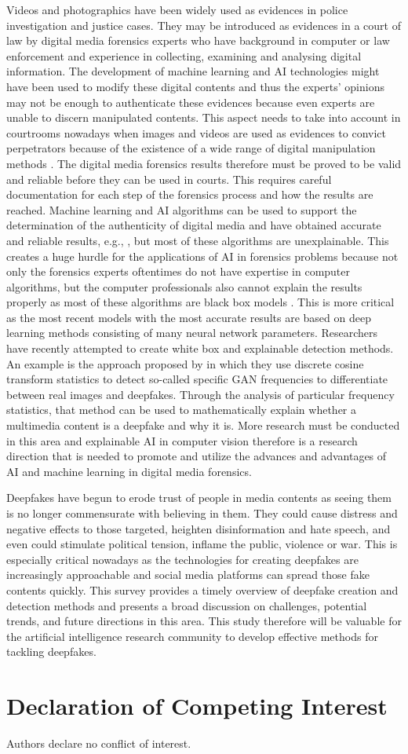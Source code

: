 Videos and photographics have been widely used as evidences in police investigation and justice cases. They may be introduced as evidences in a court of law by digital media forensics experts who have background in computer or law enforcement and experience in collecting, examining and analysing digital information. The development of machine learning and AI technologies might have been used to modify these digital contents and thus the experts' opinions may not be enough to authenticate these evidences because even experts are unable to discern manipulated contents. This aspect needs to take into account in courtrooms nowadays when images and videos are used as evidences to convict perpetrators because of the existence of a wide range of digital manipulation methods . The digital media forensics results therefore must be proved to be valid and reliable before they can be used in courts. This requires careful documentation for each step of the forensics process and how the results are reached. Machine learning and AI algorithms can be used to support the determination of the authenticity of digital media and have obtained accurate and reliable results, e.g., , but most of these algorithms are unexplainable. This creates a huge hurdle for the applications of AI in forensics problems because not only the forensics experts oftentimes do not have expertise in computer algorithms, but the computer professionals also cannot explain the results properly as most of these algorithms are black box models . This is more critical as the most recent models with the most accurate results are based on deep learning methods consisting of many neural network parameters. Researchers have recently attempted to create white box and explainable detection methods. An example is the approach proposed by  in which they use discrete cosine transform statistics to detect so-called specific GAN frequencies to differentiate between real images and deepfakes. Through the analysis of particular frequency statistics, that method can be used to mathematically explain whether a multimedia content is a deepfake and why it is. More research must be conducted in this area and explainable AI in computer vision therefore is a research direction that is needed to promote and utilize the advances and advantages of AI and machine learning in digital media forensics.

Deepfakes have begun to erode trust of people in media contents as seeing them is no longer commensurate with believing in them. They could cause distress and negative effects to those targeted, heighten disinformation and hate speech, and even could stimulate political tension, inflame the public, violence or war. This is especially critical nowadays as the technologies for creating deepfakes are increasingly approachable and social media platforms can spread those fake contents quickly. This survey provides a timely overview of deepfake creation and detection methods and presents a broad discussion on challenges, potential trends, and future directions in this area. This study therefore will be valuable for the artificial intelligence research community to develop effective methods for tackling deepfakes.
\section*{Declaration of Competing Interest}
Authors declare no conflict of interest.


\endinput